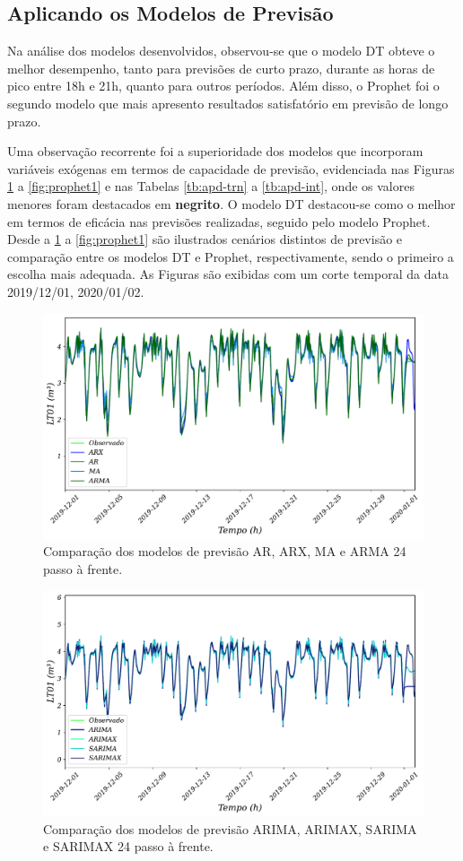 \subsection{Aplicando os Modelos de Previs\~ao}

Na análise dos modelos desenvolvidos, observou-se que o modelo DT obteve o melhor desempenho, tanto para previsões de curto prazo, durante as horas de pico entre 18h e 21h, quanto para outros períodos. Além disso, o Prophet foi o segundo modelo que mais apresento resultados satisfatório em previsão de longo prazo.

Uma observação recorrente foi a superioridade dos modelos que incorporam variáveis exógenas em termos de capacidade de previsão, evidenciada nas Figuras \ref{fig:1-ar-arx-ma} a \ref{fig:prophet1} e nas Tabelas \ref{tb:apd-trn} a \ref{tb:apd-int}, onde os valores menores foram destacados em \textbf{negrito}. O modelo DT destacou-se como o melhor em termos de eficácia nas previsões realizadas, seguido pelo modelo Prophet. Desde a \ref{fig:1-ar-arx-ma} a \ref{fig:prophet1} são ilustrados cenários distintos de previsão e comparação entre os modelos DT e Prophet, respectivamente, sendo o primeiro a escolha mais adequada. As Figuras são exibidas com um corte temporal da data 2019/12/01, 2020/01/02.


\begin{figure}[!htb]
	\centering
	\caption{Comparação dos modelos de previsão AR, ARX, MA e ARMA 24 passo à frente.}
	\label{fig:1-ar-arx-ma}
	\includegraphics[width=0.7\linewidth]{Resultados/Figuras/ARX-AR-MA-ARMA-24}
	
\end{figure}
\begin{figure}[!htb]
	\centering
	\caption{Comparação dos modelos de previsão ARIMA, ARIMAX, SARIMA e SARIMAX 24 passo à frente.}
	\label{fig:1-arimax-sarima-sarimax}
	\includegraphics[width=0.7\linewidth]{Resultados/Figuras/ARIMA-SARIMA-ARIMAX-SARIMAX-24}
	
\end{figure}

